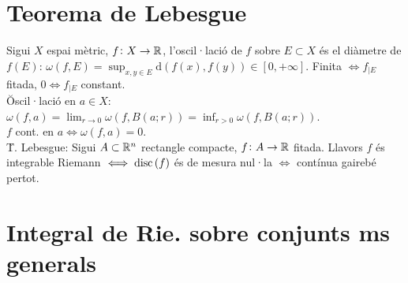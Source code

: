 \section{Teorema de Lebesgue}

\ci Sigui $X$ espai mètric, $f\colon X\to \mathbb{R}$, l'oscil·lació de $f$ sobre $E\subset X$ és el diàmetre de $f(E)$: $\omega(f,E) = \sup_{x,y\in E} \text{d}\left( f\left( x \right), f\left( y \right) \right) \in \left[ 0, +\infty \right]$. Finita $\iff f_{|E}$ fitada, $0\iff f_{|E}$ constant. \\
\u{Oscil·lació en $a\in X$}: $\omega\left( f,a \right) = \lim_{r\to 0}\omega\left( f, B\left( a;r \right) \right) = \inf_{r>0} \omega\left( f, B\left( a; r \right) \right)$. \\
\ci $f$ cont. en $a \iff \omega\left( f, a \right) = 0$. \\
\u{T. Lebesgue}: Sigui $A\subset \mathbb{R}^n$ rectangle compacte, $f\colon A\to \mathbb{R}$ fitada. Llavors $f$ és integrable Riemann $\iff \operatorname{disc}\left( f \right)$ és de mesura nul·la $\iff$ contínua gairebé pertot. \\

\section{Integral de Rie. sobre conjunts ms generals}

